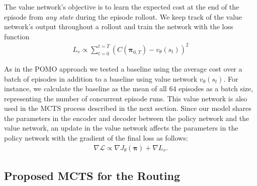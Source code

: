 \documentclass{article}
\begin{document}
The value network's objective is to learn the expected cost at the end of the episode from \textit{any state} during the episode rollout. We keep track of the value network's output throughout a rollout and train the network with the loss function
    \begin{align}\label{eqn:value_objective}
            L_v \varpropto \sum_{t=0}^{t=T}(C(\boldsymbol{\pi}_{0,T}) - v_\theta(s_t))^2
    \end{align}

As in the POMO approach\cite{kwonPOMOPolicyOptimization2021}
we tested a baseline using the average cost over a batch of episodes in addition to a baseline using value network $v_\theta(s_t)$. For instance, we calculate the baseline as the mean of all $64$ episodes as a batch size, representing the number of concurrent episode runs. This value network is also used in the MCTS process described in the next section. Since our model shares the parameters in the encoder and decoder between the policy network and the value network, an update in the value network affects the parameters in the policy network with the gradient of the final loss as follows:
    \begin{align}\label{total loss}
        \nabla \mathcal{L} \varpropto \nabla J_\theta(\boldsymbol{\pi}) + \nabla L_v.
    \end{align}

\subsection{Proposed MCTS for the Routing}
\end{document}
